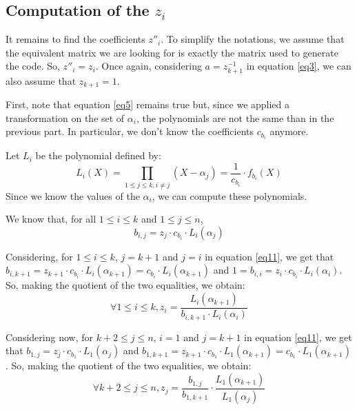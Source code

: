 \documentclass[a4paper]{article}
\begin{document}
\subsection{Computation of the $z_i$}
It remains to find the coefficients $z''_i$. To simplify the notations, we assume that the equivalent matrix we are looking for is exactly the matrix used to generate the code. So, $z''_i = z_i$.
Once again, considering $a=z_{k+1}^{-1}$ in equation \eqref{eq3}, we can also assume that $z_{k+1}=1$.

First, note that equation \eqref{eq5} remains true but, since we applied a transformation on the set of $\alpha_i$, the polynomials are not the same than in the previous part.
In particular, we don't know the coefficients $c_{b_i}$ anymore.

Let $L_i$ be the polynomial defined by:
\begin{equation}
L_i(X) = \prod_{1\leq j\leq k, i\neq j} (X-\alpha_j) = \frac{1}{c_{b_i}}\cdot f_{b_i}(X)
\label{eq10}
\end{equation}
Since we know the values of the $\alpha_i$, we can compute these polynomials.

We know that, for all $1\leq i\leq k$ and $1\leq j\leq n$, 
\begin{equation}
 b_{i,j} = z_j\cdot c_{b_i} \cdot L_i(\alpha_j)
 \label{eq11}
\end{equation}



Considering, for $1\leq i\leq k$, $j=k+1$ and $j=i$ in equation \eqref{eq11}, we get that $b_{i,k+1} = z_{k+1}\cdot c_{b_i} \cdot L_i(\alpha_{k+1}) = c_{b_i} \cdot L_i(\alpha_{k+1})$
and $1 = b_{i,i} = z_{i}\cdot c_{b_i} \cdot L_i(\alpha_{i})$. So, making the quotient of the two equalities, we obtain:
\begin{equation}
\forall 1\leq i\leq k, z_i = \frac{L_i(\alpha_{k+1})}{b_{i,k+1}\cdot L_i(\alpha_i)}
 \label{eq12}
\end{equation}

Considering now, for $k+2\leq j\leq n$, $i=1$ and $j=k+1$ in equation \eqref{eq11}, we get that $b_{1,j} = z_{j}\cdot c_{b_1} \cdot L_1(\alpha_{j})$
and $b_{1,k+1} = z_{k+1}\cdot c_{b_1} \cdot L_1(\alpha_{k+1}) = c_{b_1} \cdot L_1(\alpha_{k+1})$. So, making the quotient of the two equalities, we obtain:
\begin{equation}
\forall k+2\leq j\leq n, z_j = \frac{b_{1,j}}{b_{1,k+1}} \cdot \frac{L_1(\alpha_{k+1})}{L_1(\alpha_j)}
 \label{eq12}
\end{equation}
\end{document}
